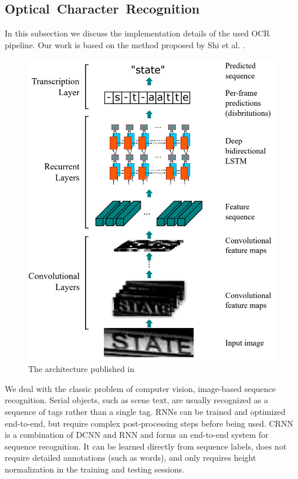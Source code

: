 \subsection{Optical~Character~Recognition}
\label{subsec:ocr}

In this subsection we discuss the implementation details of the used \ac{OCR} pipeline.
Our work is based on the method proposed by Shi et al. \cite{7801919}.
\begin{figure}
	\includegraphics[width=\textwidth]{figures/crnn.png}
	\caption{The architecture published in \cite{7801919}}
	\label{fig:ocr_architecture}
\end{figure}

We deal with the classic problem of computer vision, image-based sequence
recognition. Serial objects, such as scene text, are usually recognized as
a sequence of tags rather than a single tag. RNNs can be trained and optimized
end-to-end, but require complex post-processing steps before being used. CRNN is
a combination of DCNN and RNN and forms an end-to-end system for sequence
recognition. It can be learned directly from sequence labels, does not require
detailed annotations (such as words), and only requires height normalization in
the training and testing sessions.

